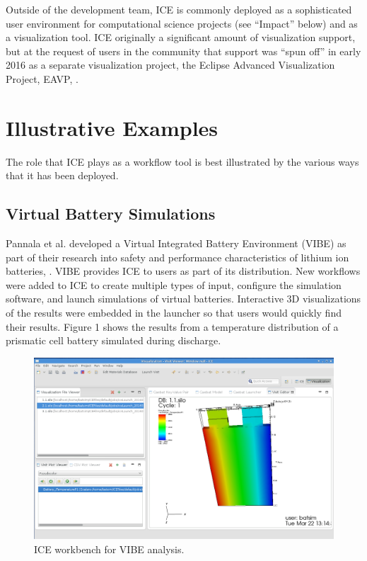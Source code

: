 Outside of the development team, ICE is commonly deployed as a
sophisticated user environment for computational science projects (see
``Impact'' below) and as a visualization tool. ICE originally a
significant amount of visualization support, but at the request of users
in the community that support was ``spun off'' in early 2016 as a
separate visualization project, the Eclipse Advanced Visualization
Project, EAVP, \cite{billings_eclipse_2015}.

\section{Illustrative Examples}\label{illustrative-examples}

The role that ICE plays as a workflow tool is best illustrated by the
various ways that it has been deployed.

\subsection{Virtual Battery
Simulations}\label{virtual-battery-simulations}

Pannala et al. developed a Virtual Integrated Battery Environment (VIBE)
as part of their research into safety and performance characteristics of
lithium ion batteries, \cite{pannala_multiscale_2015}. VIBE provides ICE to
users as part of its distribution. New workflows were added to ICE to create
multiple types of input, configure the simulation software, and launch
simulations of virtual batteries. Interactive 3D visualizations of the
results were embedded in the launcher so that users would quickly find
their results. Figure 1 shows the results from a temperature
distribution of a prismatic cell battery simulated during discharge.

\begin{figure}[htbp]
\centering
\includegraphics[width=\textwidth]{images/vibe_20151016.png}
\caption{ICE workbench for VIBE analysis.}
\end{figure}

